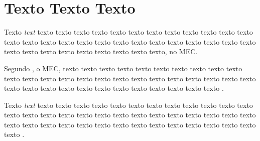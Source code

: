 \chapter{Texto Texto Texto}
\label{chap:intro}


 Texto \textit{text} texto texto texto texto texto texto texto texto texto texto texto texto texto texto texto texto texto texto texto texto texto texto texto texto texto texto texto texto texto texto texto texto texto texto texto, no \gls{MEC}.

 Segundo , o \gls{MEC}, texto texto texto texto texto texto texto texto texto texto texto texto texto texto texto texto texto texto texto texto texto texto texto texto texto texto texto texto texto texto texto texto texto texto texto texto .
 
 \begin{citacao}
 Texto \textit{text} texto texto texto texto texto texto texto texto texto texto texto texto texto texto texto texto texto texto texto texto texto texto texto texto texto texto texto texto texto texto texto texto texto texto texto texto texto texto texto texto texto \cite{manualufpe2020}.  
 \end{citacao}


 
 